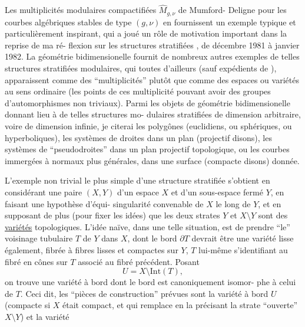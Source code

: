 
Les multiplicités modulaires compactifiées $\hat{M}_{g,\nu}$ de Mumford-%
Deligne pour les courbes algébriques stables de type $(g,\nu)$ en
fournissent un exemple typique et particulièrement inspirant, qui
a joué un rôle de motivation important dans la reprise de ma ré-%
flexion sur les structures stratifiées , de décembre 1981 à janvier
1982. La géométrie bidimensionelle fournit de nombreux autres
exemples de telles structures stratifiées modulaires, qui toutes
d'ailleurs (sauf expédients de ), apparaissent
comme des ``multiplicités'' plutôt que comme des espaces ou variétés
au sens ordinaire (les points de ces multiplicité pouvant avoir
des groupes d'automorphismes non triviaux). Parmi les objets de
géométrie bidimensionelle donnant lieu à de telles structures mo-%
dulaires stratifiées de dimension arbitraire, voire de dimension
infinie, je citerai les polygônes (euclidiens, ou sphériques, ou
hyperboliques), les systèmes de droites dans un plan (projectif
disons), les systèmes de ``pseudodroites'' dans un plan projectif
topologique, ou les courbes immergées à  normaux plus
générales, dans une surface (compacte disons) donnée.

L'exemple non trivial le plus simple d'une structure
stratifiée s'obtient en considérant une paire $(X,Y)$ d'un espace
$X$ et d'un sous-espace fermé $Y$, en faisant une hypothèse d'équi-%
singularité convenable de $X$ le long de $Y$, et en supposant de
plus (pour fixer les idées) que les deux strates $Y$ et $X\setminus Y$ sont
des \uline{variétés} topologiques. L'idée naïve, dans une telle situation,
est de prendre ``le'' voisinage tubulaire $T$ de $Y$ dans $X$, dont
le bord $\partial T$ devrait être une variété lisse également, fibrée à
fibres lisses et compactes sur $Y$, $T$ lui-même s'identifi\hand{\unsure{/}}ant au
fibré en cônes sur $T$ associé au fibré précédent. Posant
\[ U = X \setminus \mathrm{Int}(T), \]
on trouve une variété à bord dont le bord est canoniquement isomor-%
phe à celui de $T$. Ceci dit, les ``pièces de construction'' prévues
sont la variété à bord $U$ (compacte si $X$ était compact, et qui
remplace en la précisant la strate ``ouverte'' $X\setminus Y$) et la variété

